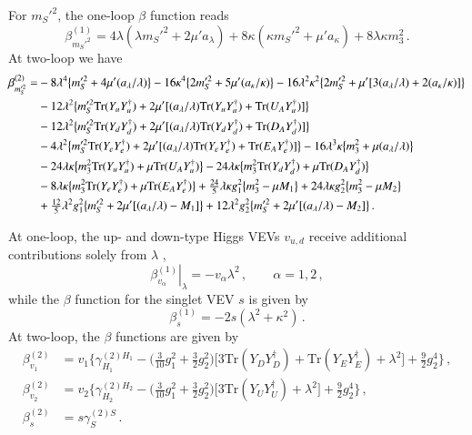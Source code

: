 \documentclass[final,3p,times,pdflatex]{elsarticle}
\newcommand{\be}{\begin{equation}}
\newcommand{\ee}{\end{equation}}
\newcommand{\lamsq}{\lambda^2}
\newcommand{\kapsq}{\kappa^2}
\newcommand{\tr}{\mathrm{Tr}}
\newcommand{\mtrisq}{m_3^2}
\newcommand{\msprsq}{m_S'^2}
\newcommand{\Alam}{a_\lambda/\lambda}
\begin{document}
For $\msprsq$, the one-loop $\beta$ function reads
%
\begin{equation}
\beta_{\msprsq}^{(1)} = 4\lambda(\lambda\msprsq + 2\mu' a_\lambda) + 8\kappa(\kappa\msprsq + \mu' a_\kappa) + 8\lambda\kappa\mtrisq \,.
\end{equation}
%
%
At two-loop we have
\begin{align}
\beta_{\msprsq}^{(2)} =& -8\lambda^4\big\{\msprsq + 4\mu'(a_\lambda/\lambda)\big\} - 16\kappa^4\big\{ 2\msprsq + 5\mu'(a_\kappa/\kappa) \big\} 
- 16\lamsq\kapsq\big\{ 2\msprsq + \mu'[3(a_\lambda/\lambda) + 2(a_\kappa/\kappa)] \big\} \notag \\
%
&-12\lamsq\big\{ \msprsq\tr( Y_u Y_u^\dagger) + 2\mu'[(\Alam)\tr( Y_u Y_u^\dagger) + \tr( U_A Y_u^\dagger)] \big\} \notag \\
%
&-12\lamsq\big\{\msprsq\tr( Y_d Y_d^\dagger) + 2\mu'[(\Alam)\tr( Y_d Y_d^\dagger) + \tr( D_A Y_d^\dagger)] \big\} \notag \\
%
&-4\lamsq\big\{\msprsq\tr( Y_e Y_e^\dagger) + 2\mu'[(\Alam)\tr( Y_e Y_e^\dagger) + \tr( E_A Y_e^\dagger)] \big\} 
-16\lambda^3\kappa\big\{ \mtrisq + \mu(\Alam)\big \} \notag \\
%
&-24\lambda\kappa\big\{ \mtrisq\tr( Y_u Y_u^\dagger) + \mu\tr( U_A Y_u^\dagger)\big\} 
-24\lambda\kappa\big\{ \mtrisq\tr( Y_d Y_d^\dagger) + \mu\tr( D_A Y_d^\dagger)\big\} \notag \\
%
&-8\lambda\kappa\big\{ \mtrisq\tr( Y_e Y_e^\dagger) + \mu\tr( E_A Y_e^\dagger)\big\} 
+\tfrac{24}{5}\lambda\kappa g_1^2\big\{\mtrisq - \mu M_1\big\} + 24\lambda\kappa g_2^2\big\{\mtrisq - \mu M_2 \big\} \notag \\
%
&+\tfrac{12}{5}\lamsq g_1^2\big\{\msprsq + 2\mu'[(\Alam) - M_1]\big\} 
+12\lamsq g_2^2 \big\{\msprsq + 2\mu'[(\Alam) - M_2] \big\}\,.
\end{align}

At one-loop, the up- and down-type Higgs VEVs $v_{u,d}$ receive additional contributions solely from $\lambda$ \cite{Sper13},
%
\be
\left.\beta^{(1)}_{v_\alpha}\right|_\lambda = -v_\alpha\lamsq\,, \qquad \alpha=1,2\,,
\ee
%
while the $\beta$ function for the singlet VEV $s$ is given by
%
\be 
\beta^{(1)}_s = -2s(\lamsq + \kapsq)\,.
\ee
%
At two-loop, the $\beta$ functions are given by \cite{Sper13,Sper13-2}
%
\begin{align}
\beta^{(2)}_{v_1} &= v_1\Bigg\{\gamma^{(2)H_1}_{H_1} - \Big(\tfrac{3}{10}g_1^2 + \tfrac{3}{2}g_2^2\Big)\Big[3\tr(Y_DY_D^\dagger) + \tr(Y_EY_E^\dagger) + \lamsq\Big] + \tfrac{9}{2}g_2^4\Bigg\}\,, \\
%
\beta^{(2)}_{v_2} &= v_2\Bigg\{\gamma^{(2)H_2}_{H_2} - 
\Big(\tfrac{3}{10}g_1^2 + \tfrac{3}{2}g_2^2\Big)
\Big[3\tr(Y_UY_U^\dagger) + \lamsq\Big] + \tfrac{9}{2}g_2^4\Bigg\}\,, \\
%
\beta^{(2)}_s &= s\gamma^{(2)S}_S\,.
\end{align}
\end{document}
